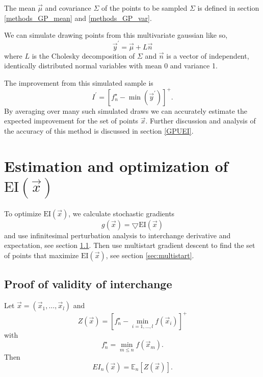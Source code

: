 \documentclass[phd,tocprelim]{cornell}
\begin{document}
The mean $\vec{\mu}$ and covariance $\Sigma$ of the points to be sampled $\Sigma$ is defined in section \ref{methods_GP_mean} and \ref{methods_GP_var}.

We can simulate drawing points from this multivariate gaussian like so,
\begin{equation}
    \vec{y}^{\prime} = \vec{\mu} + L \vec{n}
\end{equation}
where $L$ is the Cholesky decomposition of $\Sigma$ and $\vec{n}$ is a vector of independent, identically distributed normal variables with mean 0 and variance 1.

The improvement from this simulated sample is
\begin{equation}
    I^{\prime} = \left[f_{n}^{\star} - \min(\vec{y}^{\prime})\right]^{+}.
\end{equation}
By averaging over many such simulated draws we can accurately estimate the expected improvement for the set of points $\vec{x}$. Further discussion and analysis of the accuracy of this method is discussed in section \ref{GPUEI}.


\section{Estimation and optimization of $\mbox{EI}(\vec{x})$}

To optimize $\mbox{EI}(\vec{x})$, we calculate stochastic gradients
\begin{equation}
 g(\vec{x}) = \bigtriangledown \mbox{EI}(\vec{x})
\end{equation}
and use infinitesimal perturbation analysis \cite{Fu1994} to interchange derivative and expectation, see section \ref{EPI_proof}. Then use multistart gradient descent to find the set of points that maximize $\mbox{EI}(\vec{x})$, see section \ref{sec:multistart}.

\subsection{Proof of validity of interchange}
\label{EPI_proof}

Let $\vec{x} = \left(\vec{x}_{1}, \ldots, \vec{x}_{l}\right)$ and
\begin{equation}
    Z \left(\vec{x}\right) = \left[f_{n}^{\star} - \min_{i = 1,\ldots,l} f \left(\vec{x}_{i}\right)\right]^{+}
\end{equation}
with
\begin{equation}
    f_{n}^{\star} = \min_{m\leq n} f \left(\vec{x}_{m}\right).
\end{equation}
Then
\begin{equation}
    EI_{n}(\vec{x}) = \mathbb{E}_{n}\left[Z \left(\vec{x}\right)\right].
\end{equation}
\end{document}

